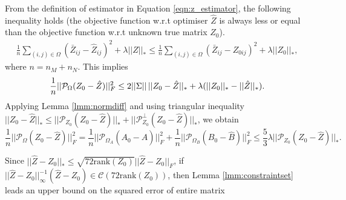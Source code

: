 \documentclass{article} %
\newcommand\mc{\mathcal} %
\begin{document}
From the definition of estimator in Equation \ref{eqn:z_estimator}, the following inequality holds (the objective function  w.r.t optimiser $\hat{Z}$ is always less or equal than the objective function w.r.t unknown true matrix $Z_0$).
\begin{align}
\frac{1}{n} \sum_{(i,j) \in \Omega}(\bar{Z}_{ij} - \hat{Z}_{ij})^2 + \lambda ||\hat{Z}||_* 
\leq \frac{1}{n} \sum_{(i,j) \in \Omega}(\bar{Z}_{ij} - {Z}_{0ij})^2 + \lambda ||Z_0||_*,
\end{align}
where $n = n_M + n_N$. This implies
\begin{equation}
\frac{1}{n}||\mathcal{P}_\Omega(Z_0 - \hat{Z}) ||_F^2 \leq 2||\Sigma||\,||Z_0 - \hat{Z}||_* + \lambda(||Z_0||_* - ||\hat{Z}||_*). \\
\end{equation}
Applying Lemma \ref{lmm:normdiff} and using triangular inequality $||Z_0 - \hat{Z}||_* \leq ||\mc{P}_{Z_0}(Z_0 - \hat{Z})||_* + ||\mc{P}_{Z_0}^\perp(Z_0 - \hat{Z})||_*$, we obtain
\begin{equation}
\frac{1}{n}||\mathcal{P}_\Omega(Z_0 - \hat{Z}) ||_F^2 = \frac{1}{n}||\mc{P}_{\Omega_A}(A_0-\hat{A})||_F^2 + \frac{1}{n}||\mc{P}_{\Omega_B}(B_0-\hat{B})||_F^2
\leq \frac{5}{3}\lambda ||\mc{P}_{Z_0}(Z_0-\hat{Z})||_*.
\label{eqn:tri}
\end{equation}

Since $||\hat{Z} - Z_0||_* \leq \sqrt{72\text{rank}(Z_0)}||\hat{Z} - Z_0||_F$, if $||\hat{Z}-Z_0||_\infty^{-1}(\hat{Z}-Z_0) \in \mc{C}(72\text{rank}(Z_0))$, then Lemma \ref{lmm:constraintset} leads an upper bound on the squared error of entire matrix
\end{document}
